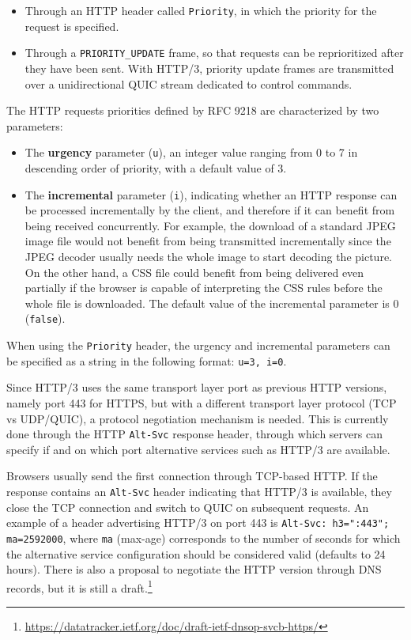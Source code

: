 \begin{itemize}
    \item Through an HTTP header called \texttt{Priority}, in which the priority for the request is specified.
    \item Through a \texttt{PRIORITY\_UPDATE} frame, so that requests can be reprioritized after they have been sent. With HTTP/3, priority update frames are transmitted over a unidirectional QUIC stream dedicated to control commands.
\end{itemize}

The HTTP requests priorities defined by RFC 9218 are characterized by two parameters:

\begin{itemize}
    \item The \textbf{urgency} parameter (\texttt{u}), an integer value ranging from 0 to 7 in descending order of priority, with a default value of 3.
    \item The \textbf{incremental} parameter (\texttt{i}), indicating whether an HTTP response can be processed incrementally by the client, and therefore if it can benefit from being received concurrently. For example, the download of a standard JPEG image file would not benefit from being transmitted incrementally since the JPEG decoder usually needs the whole image to start decoding the picture. On the other hand, a CSS file could benefit from being delivered even partially if the browser is capable of interpreting the CSS rules before the whole file is downloaded. The default value of the incremental parameter is 0 (\texttt{false}).
\end{itemize}

When using the \texttt{Priority} header, the urgency and incremental parameters can be specified as a string in the following format: \texttt{u=3, i=0}.

Since HTTP/3 uses the same transport layer port as previous HTTP versions, namely port 443 for HTTPS, but with a different transport layer protocol (TCP vs UDP/QUIC), a protocol negotiation mechanism is needed. This is currently done through the HTTP \texttt{Alt-Svc} response header, through which servers can specify if and on which port alternative services such as HTTP/3 are available.

Browsers usually send the first connection through TCP-based HTTP. If the response contains an \texttt{Alt-Svc} header indicating that HTTP/3 is available, they close the TCP connection and switch to QUIC on subsequent requests. An example of a header advertising HTTP/3 on port 443 is \verb|Alt-Svc: h3=":443"; ma=2592000|, where \texttt{ma} (max-age) corresponds to the number of seconds for which the alternative service configuration should be considered valid (defaults to 24 hours). There is also a proposal to negotiate the HTTP version through DNS records, but it is still a draft.\footnote{\url{https://datatracker.ietf.org/doc/draft-ietf-dnsop-svcb-https/}}

